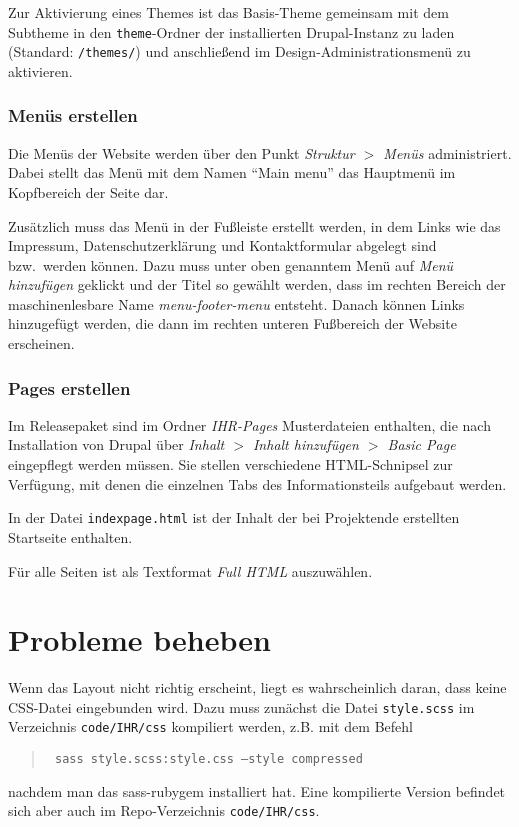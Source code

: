 \documentclass[a4paper,11pt,twoside]{article}
\begin{document}
Zur Aktivierung eines Themes ist das Basis-Theme gemeinsam mit dem Subtheme in
den \texttt{theme}-Ordner der installierten Drupal-Instanz zu laden (Standard:
\texttt{/themes/}) und anschließend im Design-Administrationsmenü zu
aktivieren.

\subsubsection{Menüs erstellen}
Die Menüs der Website werden über den Punkt \textit{Struktur $>$ Menüs}
administriert. Dabei stellt das Menü mit dem Namen "`Main menu"' das Hauptmenü
im Kopfbereich der Seite dar.

Zusätzlich muss das Menü in der Fußleiste erstellt werden, in dem Links wie
das Impressum, Datenschutzerklärung und Kontaktformular abgelegt sind
bzw.\ werden können.  Dazu muss unter oben genanntem Menü auf \emph{Menü
  hinzufügen} geklickt und der Titel so gewählt werden, dass im rechten
Bereich der maschinenlesbare Name \textit{menu-footer-menu} entsteht. Danach
können Links hinzugefügt werden, die dann im rechten unteren Fußbereich der
Website erscheinen.

\subsubsection{Pages erstellen}
Im Releasepaket sind im Ordner \emph{IHR-Pages} Musterdateien enthalten, die
nach Installation von Drupal über \textit{Inhalt $>$ Inhalt hinzufügen $>$
  Basic Page} eingepflegt werden müssen. Sie stellen verschiedene
HTML-Schnipsel zur Verfügung, mit denen die einzelnen Tabs des
Informationsteils aufgebaut werden.

In der Datei \texttt{indexpage.html} ist der Inhalt der bei Projektende
erstellten Startseite enthalten. 

Für alle Seiten ist als Textformat \emph{Full HTML} auszuwählen.

\section{Probleme beheben}

Wenn das Layout nicht richtig erscheint, liegt es wahrscheinlich daran, dass
keine CSS-Datei eingebunden wird.  Dazu muss zunächst die Datei
\texttt{style.scss} im Verzeichnis \texttt{code/IHR/css} kompiliert werden,
z.B. mit dem Befehl
\begin{quote}\tt
  sass style.scss:style.css --style compressed
\end{quote}
nachdem man das sass-rubygem installiert hat. Eine kompilierte Version befindet
sich aber auch im Repo-Verzeichnis \texttt{code/IHR/css}.
\end{document}
